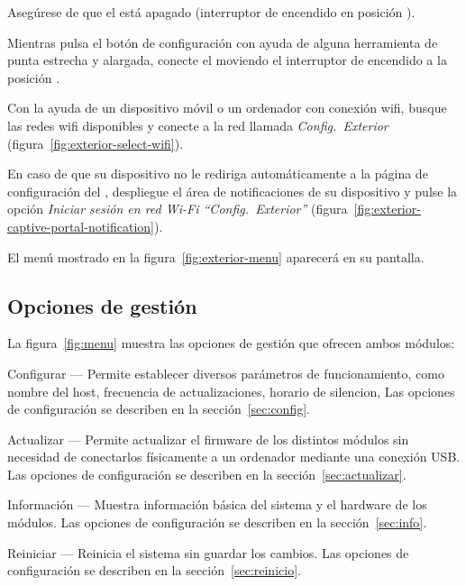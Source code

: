\begin{enumeratecompact}

\item Asegúrese de que el \ME está apagado (interruptor de encendido  en posición \off).

\item Mientras pulsa el botón de configuración  con ayuda de alguna herramienta de punta estrecha y alargada, conecte el \ME moviendo el interruptor de encendido  a la  posición \on.

\item Con la ayuda de un dispositivo móvil o un ordenador con conexión wifi, busque las redes wifi disponibles y conecte a la red llamada \emph{Config.~Exterior} (figura~\ref{fig:exterior-select-wifi}).

\item En caso de que su dispositivo no le rediriga automáticamente a la página de configuración del \ME, despliegue el área de notificaciones de su dispositivo y pulse la opción \emph{Iniciar sesión en red Wi-Fi ``Config.~Exterior''} (figura~\ref{fig:exterior-captive-portal-notification}).

\item El menú mostrado en la figura~\ref{fig:exterior-menu} aparecerá en su pantalla.

\end{enumeratecompact}

\subsection{Opciones de gestión}

La figura~\ref{fig:menu} muestra las opciones de gestión que ofrecen ambos módulos:

\begin{descriptioncompact}

\item[Configurar] --- Permite establecer diversos parámetros de funcionamiento, como nombre del host, frecuencia de actualizaciones, horario de silencion, \etc Las opciones de configuración se describen en la sección~\ref{sec:config}.

\item[Actualizar] --- Permite actualizar el firmware de los distintos módulos sin necesidad de conectarlos físicamente a un ordenador mediante una conexión USB. Las opciones de configuración se describen en la sección~\ref{sec:actualizar}.

\item[Información] --- Muestra información básica del sistema y el hardware de los módulos. Las opciones de configuración se describen en la sección~\ref{sec:info}.

\item[Reiniciar] --- Reinicia el sistema sin guardar los cambios. Las opciones de configuración se describen en la sección~\ref{sec:reinicio}.

\end{descriptioncompact}

